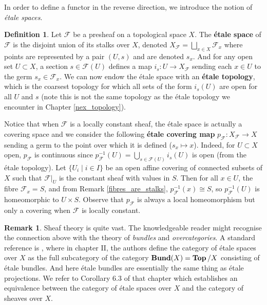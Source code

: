 \documentclass{article}
\theoremstyle{plain}
\theoremstyle{definition}
\newtheorem{definition}[theorem]{Definition}
\newtheorem{remark}{Remark}
\DeclareMathOperator{\Top}{\bf{Top}}
\DeclareMathOperator{\Bund}{\bf{Bund}}
\begin{document}
\noindent In order to define a functor in the reverse direction, we introduce the notion of \textit{\'etale spaces}. 


\begin{definition}
\label{etale_space}
    Let $\mathcal{F}$ be a presheaf on a topological space $X$. 
    The \textbf{\'etale space} of $\mathcal{F}$ is the disjoint union of its stalks over $X$, denoted $X_{\mathcal{F}} = \bigsqcup_{x\in X}\mathcal{F}_x$ where points are represented by a pair $(U,s)$ and are denoted $s_x$. 
    And for any open set $U \subset X$, a section $s \in \mathcal{F}(U)$ defines a map $i_s : U \rightarrow X_{\mathcal{F}}$ sending each $x\in U$ to the germ $s_x\in\mathcal{F}_x$.
    We can now endow the \'etale space with an \textbf{\'etale topology}, which is the coarsest topology for which all sets of the form $i_s(U)$ are open for all $U$ and $s$ (note this is not the same topology as the \'etale topology we encounter in Chapter \ref{nex_topology}).
\end{definition}



\noindent Notice that when $\mathcal{F}$ is a locally constant sheaf, the \'etale space is actually a covering space and we consider the following \textbf{\'etale covering map} $p_{\mathcal{F}}:X_{\mathcal{F}}\rightarrow X$ sending a germ to the point over which it is defined ($s_x\mapsto x$).
Indeed, for $U\subset X$ open, $p_{\mathcal{F}}$ is continuous since $p_{\mathcal{F}}^{-1}(U) = \bigcup_{s\in\mathcal{F}(U)} i_s(U)$ is open (from the \'etale topology).
Let $\{U_i\mid i\in I\}$ be an open affine covering of connected subsets of $X$ such that $\mathcal{F}\vert_U$ is the constant sheaf with values in $S$. Then for all $x\in U$, the fibre $\mathcal{F}_x=S$, and from Remark \ref{fibres_are_stalks}, $p_{\mathcal{F}}^{-1}(x)\cong S$, so $p_{\mathcal{F}}^{-1}(U)$ is homeomorphic to $U\times S$. Observe that $p_{\mathcal{F}}$ is always a local homeomorphism but only a covering when $\mathcal{F}$ is locally constant.

\begin{remark}
\label{Sheaves_X_equiv_etale_X}
    Sheaf theory is quite vast. The knowledgeable reader might recognise the connection above with the theory of \textit{bundles} and \textit{overcategories}. A standard reference is \cite{sheaves_geometry_logic}, where in chapter II, the authors define the category of \'etale spaces over $X$ as the full subcategory of the category $\Bund(X) = \Top/X$ consisting of \'etale bundles. And here \'etale bundles are essentially the same thing as \'etale projections.
    We refer to Corollary $6.3$ of that chapter which establishes an equivalence between the category of \'etale spaces over $X$ and the category of sheaves over $X$.
\end{remark}
\end{document}
